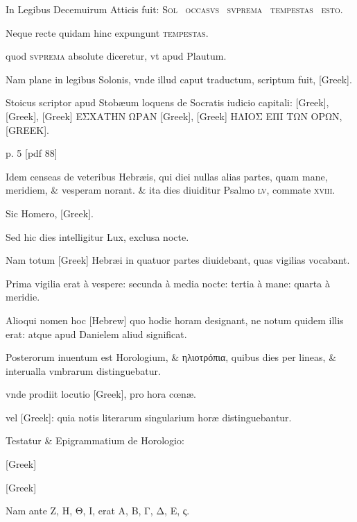 In Legibus Decemuirum Atticis fuit:
\textsc{Sol~ occasvs~
svprema~ tempestas~ esto}.

Neque recte
quidam hinc expungunt \textsc{tempestas}.

quod \textsc{svprema} absolute
diceretur, vt apud Plautum.

Nam plane in legibus Solonis, vnde illud
caput traductum, scriptum fuit, \textgreek{[Greek]}.

Stoicus
scriptor apud Stobæum loquens de Socratis iudicio capitali: 
\textgreek{[Greek], [Greek], [Greek]
ΕΣΧΑΤΗΝ ΩΡΑΝ [Greek], [Greek] ΗΛΙΟΣ ΕΠΙ ΤΩΝ
ΟΡΩΝ, [GREEK]}.



p. 5 [pdf 88]

Idem censeas de veteribus Hebræis,
qui diei nullas alias partes, quam mane, meridiem, \& vesperam norant.
\& ita dies diuiditur Psalmo \textsc{lv}, commate \textsc{xviii}.

Sic Homero,
\textgreek{[Greek]}.

Sed hic dies intelligitur Lux, exclusa nocte.

Nam totum \textgreek{[Greek]} Hebræi in quatuor partes diuidebant, quas vigilias
vocabant.

Prima vigilia erat à vespere: secunda à media nocte:
tertia à mane: quarta à meridie.

Alioqui nomen hoc \texthebrew{[Hebrew]} quo hodie
horam designant, ne notum quidem illis erat: atque apud Danielem
aliud significat.

Posterorum inuentum est Horologium, \& \textgreek{ηλιοτρόπια},
quibus dies per lineas, \& interualla vmbrarum distinguebatur.

vnde prodiit locutio \textgreek{[Greek]}, pro hora cœnæ.

vel \textgreek{[Greek]}:
 quia notis literarum singularium horæ distinguebantur.

Testatur \& Epigrammatium de Horologio:

\textgreek{[Greek]}

\textgreek{[Greek]}

Nam ante
\textgreek{Ζ, Η, Θ, Ι,} erat \textgreek{Α, Β, Γ, Δ, Ε, ς.}

